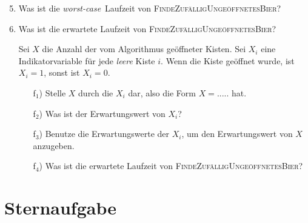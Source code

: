 \documentclass{uebung_cs}
\begin{document}
\begin{aufgabe}[Bierkisten]
	\begin{enumerate}
		\setcounter{enumi}{4}
		\item Was ist die \textit{worst-case}~Laufzeit von \textsc{FindeZufälligUngeöffnetesBier}?
		\item Was ist die erwartete Laufzeit von \textsc{FindeZufälligUngeöffnetesBier}?
		\item[] Sei $X$ die Anzahl der vom Algorithmus geöffneter Kisten. Sei $X_i$ eine Indikatorvariable für jede \emph{leere} Kiste $i$. Wenn die Kiste geöffnet wurde, ist $X_i = 1$, sonst ist $X_i = 0$. 
		\begin{itemize}[topsep=0.21cm, leftmargin=1.2cm]
			\item[f$_1$)] Stelle $X$ durch die $X_i$ dar, also die Form $X = .....$ hat.
			\item[f$_2$)] Was ist der Erwartungswert von $X_i$?
			\item[f$_3$)] Benutze die Erwartungswerte der $X_i$, um den Erwartungswert von $X$ anzugeben.
			\item[f$_4$)] Was ist die erwartete Laufzeit von \textsc{FindeZufälligUngeöffnetesBier}?
		\end{itemize}
	\end{enumerate}
\end{aufgabe}

\newpage
\section*{Sternaufgabe}
\end{document}
